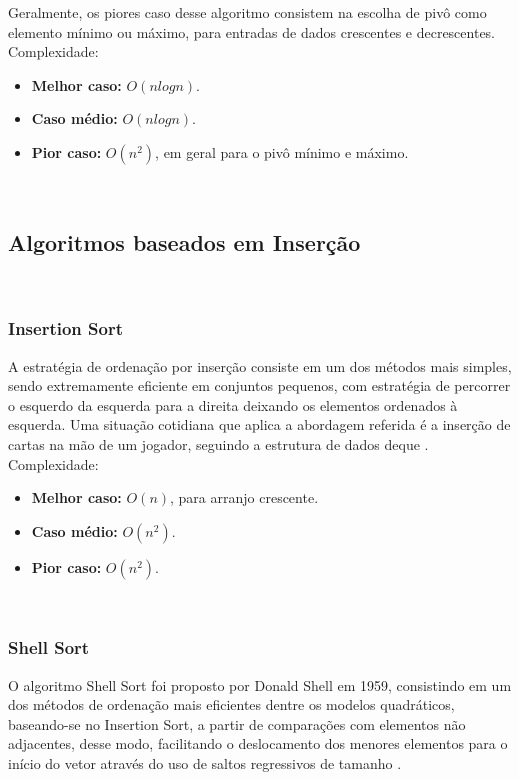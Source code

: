\documentclass[conference,onecolumn]{IEEEtran}
\begin{document}
Geralmente, os piores caso desse algoritmo consistem na escolha de pivô como elemento mínimo ou máximo, para entradas de dados crescentes e decrescentes.\\

Complexidade:
\begin{itemize}
\item \textbf{Melhor caso:} $O (nlog n)$.
\item \textbf{Caso médio:} $O (nlog n)$.
\item \textbf{Pior caso:} $O (n^2)$, em geral para o pivô mínimo e máximo.
\end{itemize}

~\\
\subsection{Algoritmos baseados em Inserção}

~\\
\subsubsection{Insertion Sort}

A estratégia de ordenação por inserção consiste em um dos métodos mais simples, sendo extremamente eficiente em conjuntos pequenos, com estratégia de percorrer o esquerdo da esquerda para a direita deixando os elementos ordenados  à esquerda. Uma situação cotidiana que aplica a abordagem referida é a inserção de cartas na mão de um jogador, seguindo a estrutura de dados deque \cite{biggar}.\\

Complexidade:
\begin{itemize}
\item \textbf{Melhor caso:} $O (n)$, para arranjo crescente.
\item \textbf{Caso médio:} $O (n^2)$.
\item \textbf{Pior caso:} $O (n^2)$.
\end{itemize}

~\\
\subsubsection{Shell Sort}

O algoritmo Shell Sort foi proposto por Donald Shell em 1959, consistindo em um dos métodos de ordenação mais eficientes dentre os modelos quadráticos, baseando-se no Insertion Sort, a partir de comparações com elementos não adjacentes, desse modo, facilitando o deslocamento dos menores elementos para o início do vetor através do uso de saltos regressivos de tamanho \cite{ziviani}.
\end{document}
